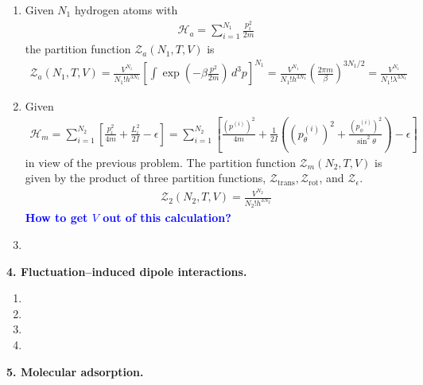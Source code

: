 \documentclass{article}
\theoremstyle{definition}
\newcommand{\ham}{\mathcal{H}}
\newcommand{\be}{\beta}
\newcommand{\f}[2]{\frac{#1}{#2}}
\newcommand{\lp}{\left(}
\newcommand{\rp}{\right)}
\newcommand{\lb}{\left[}
\newcommand{\rb}{\right]}
\begin{document}
\begin{enumerate}[label=(\alph*)]
	\item Given $N_1$ hydrogen atoms with
	\begin{align*}
	\ham_a = \sum^{N_1}_{i=1} \f{p_i^2}{2m}
	\end{align*}
	the partition function $\mathcal{Z}_a(N_1,T,V)$ is 
	\begin{align*}
	\mathcal{Z}_a(N_1,T,V) = \f{V^{N_1}}{N_1!h^{3N_1}}\lb \int \exp(-\be \f{p^2}{2m}) \,d^3p\rb^{N_1} = {\f{V^{N_1}}{N_1! h^{3N_1}} \lp \f{2\pi m}{\be} \rp^{3N_1/2}} = \boxed{\f{V^{N_1}}{N_1! \lambda^{3N_1}}}
	\end{align*}
	
	\item Given 
	\begin{align*}
	\ham_m = \sum_{i=1}^{N_2} \lb \f{p_i^2}{4m} + \f{L_i^2}{2I} -\epsilon  \rb = \sum_{i=1}^{N_2} \lb \f{(p^{(i)})^2}{4m} + \f{1}{2I}\lp (p^{(i)}_\theta)^2 + \f{(p^{(i)}_\phi)^2}{\sin^2\theta} \rp -\epsilon  \rb
	\end{align*}
	in view of the previous problem. The partition function $\mathcal{Z}_m (N_2,T,V)$ is given by the product of three partition functions, $\mathcal{Z}_\text{trans}, \mathcal{Z}_\text{rot}$, and $\mathcal{Z}_\epsilon$.
	\begin{align*}
	\mathcal{Z}_2(N_2,T,V) = \f{V^{N_2}}{N_2! h^{3N_2}}
	\end{align*}
	\textcolor{blue}{\textbf{How to get $V$ out of this calculation?}}
	
	\item 
\end{enumerate}



\noindent \textbf{4. Fluctuation–induced dipole interactions.}

\begin{enumerate}[label=(\alph*)]
	\item 
	
	\item 
	
	\item 
	
	\item 
\end{enumerate}



\noindent \textbf{5. Molecular adsorption.}
\end{document}
